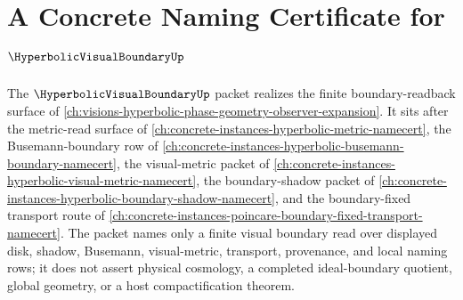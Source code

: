 \chapter{A Concrete Naming Certificate for $\HyperbolicVisualBoundaryUp$}
\label{ch:concrete-instances-hyperbolic-visual-boundary-namecert}

The $\HyperbolicVisualBoundaryUp$ packet realizes the finite boundary-readback surface of \autoref{ch:visions-hyperbolic-phase-geometry-observer-expansion}. It sits after the metric-read surface of \autoref{ch:concrete-instances-hyperbolic-metric-namecert}, the Busemann-boundary row of \autoref{ch:concrete-instances-hyperbolic-busemann-boundary-namecert}, the visual-metric packet of \autoref{ch:concrete-instances-hyperbolic-visual-metric-namecert}, the boundary-shadow packet of \autoref{ch:concrete-instances-hyperbolic-boundary-shadow-namecert}, and the boundary-fixed transport route of \autoref{ch:concrete-instances-poincare-boundary-fixed-transport-namecert}. The packet names only a finite visual boundary read over displayed disk, shadow, Busemann, visual-metric, transport, provenance, and local naming rows; it does not assert physical cosmology, a completed ideal-boundary quotient, global geometry, or a host compactification theorem.

